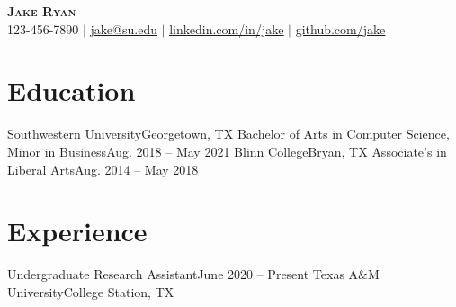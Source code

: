 




\begin{center}
    \textbf{\Huge \scshape Jake Ryan} \\ \vspace{1pt}
    \small 123-456-7890 $|$ \href{mailto:x@x.com}{\underline{jake@su.edu}} $|$ 
    \href{https://linkedin.com/in/...}{\underline{linkedin.com/in/jake}} $|$
    \href{https://github.com/...}{\underline{github.com/jake}}
\end{center}


\section{Education}
  \resumeSubHeadingListStart
    \resumeSubheading
      {Southwestern University}{Georgetown, TX}
      {Bachelor of Arts in Computer Science, Minor in Business}{Aug. 2018 -- May 2021}
    \resumeSubheading
      {Blinn College}{Bryan, TX}
      {Associate's in Liberal Arts}{Aug. 2014 -- May 2018}
  \resumeSubHeadingListEnd


\section{Experience}
  \resumeSubHeadingListStart

    \resumeSubheading
      {Undergraduate Research Assistant}{June 2020 -- Present}
      {Texas A\&M University}{College Station, TX}
      \resumeItemListStart
      \resumeItemListEnd
      
